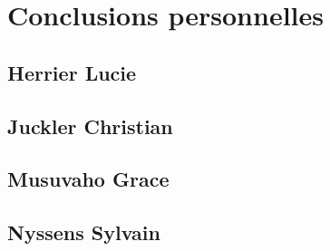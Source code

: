 \section{Conclusions personnelles}
\subsection{Herrier Lucie}

\subsection{Juckler Christian}

\subsection{Musuvaho Grace}

\subsection{Nyssens Sylvain}